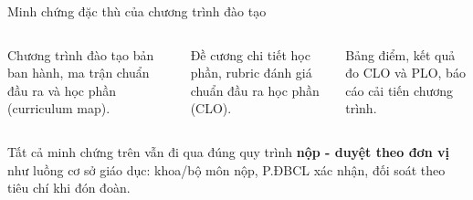 \documentclass[aspectratio=169, 11pt]{beamer}
\begin{document}
\begin{frame}{Minh chứng đặc thù của chương trình đào tạo}
\vspace{0.2cm}
\begin{columns}[T]
\begin{column}{0.33\textwidth}
\begin{tcolorbox}[enhanced, colback=lightwarm, colframe=daumaroon, boxrule=0pt, leftrule=3pt, arc=2pt, title=Thiết kế chương trình, fonttitle=\scriptsize\bfseries\color{white}, coltitle=white, colbacktitle=daumaroon, fontupper=\scriptsize]
Chương trình đào tạo bản ban hành, ma trận chuẩn đầu ra và học phần (curriculum map).
\end{tcolorbox}
\end{column}
\begin{column}{0.33\textwidth}
\begin{tcolorbox}[enhanced, colback=lightnavy, colframe=daunavy, boxrule=0pt, leftrule=3pt, arc=2pt, title=Tổ chức dạy học, fonttitle=\scriptsize\bfseries\color{white}, coltitle=white, colbacktitle=daunavy, fontupper=\scriptsize]
Đề cương chi tiết học phần, rubric đánh giá chuẩn đầu ra học phần (CLO).
\end{tcolorbox}
\end{column}
\begin{column}{0.33\textwidth}
\begin{tcolorbox}[enhanced, colback=lightgold, colframe=daugold!80!black, boxrule=0pt, leftrule=3pt, arc=2pt, title=Kết quả đo lường, fonttitle=\scriptsize\bfseries\color{daunavy}, coltitle=daunavy, colbacktitle=daugold, fontupper=\scriptsize]
Bảng điểm, kết quả đo CLO và PLO, báo cáo cải tiến chương trình.
\end{tcolorbox}
\end{column}
\end{columns}
\vspace{0.3cm}
\begin{keypoint}
Tất cả minh chứng trên vẫn đi qua đúng quy trình \textbf{nộp - duyệt theo đơn vị} như luồng cơ sở giáo dục: khoa/bộ môn nộp, P.ĐBCL xác nhận, đối soát theo tiêu chí khi đón đoàn.
\end{keypoint}
\end{frame}
\end{document}
